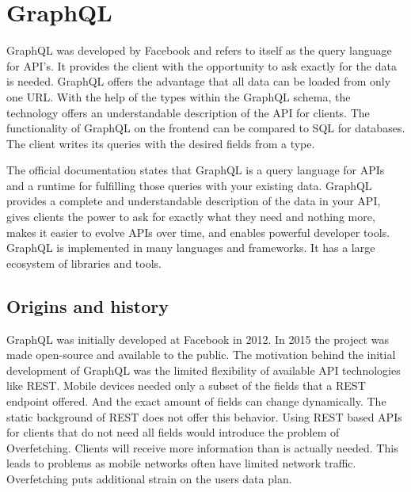 \section{GraphQL}\label{section:background:graphql}

GraphQL was developed by Facebook and refers to itself as the query language for API's. It provides the client with the opportunity to ask exactly for the data is needed. GraphQL offers the advantage that all data can be loaded from only one URL. With the help of the types within the GraphQL schema, the technology offers an understandable description of the API for clients. \cite{misc:-:background:graphql:graphql-org} The functionality of GraphQL on the frontend can be compared to SQL for databases. The client writes its queries with the desired fields from a type.

\bigskip

\noindent The official documentation states that GraphQL is a query language for APIs and a runtime for fulfilling those queries with your existing data. GraphQL provides a complete and understandable description of the data in your API, gives clients the power to ask for exactly what they need and nothing more, makes it easier to evolve APIs over time, and enables powerful developer tools. GraphQL is implemented in many languages and frameworks. It has a large ecosystem of libraries and tools.

\subsection{Origins and history}\label{subsection:background:graphql:origins-and-history}

GraphQL was initially developed at Facebook in 2012. In 2015 the project was made open-source and available to the public. The motivation behind the initial development of GraphQL was the limited flexibility of available API technologies like REST. Mobile devices needed only a subset of the fields that a REST endpoint offered. And the exact amount of fields can change dynamically. The static background of REST does not offer this behavior. Using REST based APIs for clients that do not need all fields would introduce the problem of Overfetching. Clients will receive more information than is actually needed. This leads to problems as mobile networks often have limited network traffic. Overfetching puts additional strain on the users data plan. \cite{misc:2015:bryon:background:graphql:graphql-query-language}

